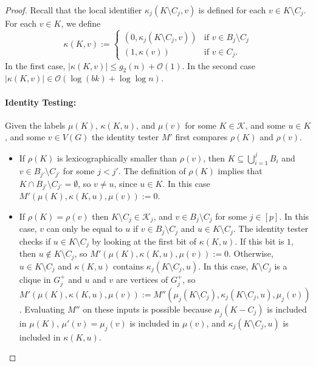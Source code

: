 \documentclass{patmorin}
\renewcommand{\le}{\leqslant}
\newcommand{\Oh}{\calO}
\newcommand{\calK}{\mathcal{K}}
\newcommand{\calO}{\mathcal{O}}
\begin{document}
\begin{proof}
    Recall that the local identifier $\kappa_j(K\setminus C_j,v)$ is defined for each $v\in K\setminus C_j$.
    For each $v\in K$, we define
    \[
         \kappa(K,v):=
         \begin{cases}
           (0,\kappa_j(K\setminus C_j,v)) & \text{if $v\in B_j\setminus C_j$} \\
           (1,\kappa(v)) & \text{if $v\in C_j$.}
         \end{cases}
     \]
     In the first case, $|\kappa(K,v)|\le g_2(n)+\Oh(1)$.
     In the second case $|\kappa(K,v)|\in \Oh(\log(bk)+\log\log n)$.


     \paragraph{Identity Testing:}
     Given the labels $\mu(K)$, $\kappa(K,u)$, and $\mu(v)$ for some $K\in\calK$, and some $u\in K$, and some $v\in V(G)$ the identity tester $M'$ first compares $\rho(K)$ and $\rho(v)$.
     \begin{itemize}
       \item If $\rho(K)$ is lexicographically smaller than $\rho(v)$, then $K\subseteq\bigcup_{i=1}^j B_i$ and $v\in B_{j'}\setminus C_{j'}$ for some $j < j'$.
       The definition of $\rho(K)$ implies that $K\cap B_{j'}\setminus C_{j'}=\emptyset$, so $v\neq u$, since $u\in K$. In this case $M'(\mu(K),\kappa(K,u),\mu(v)):=0$.
       
       \item If $\rho(K)=\rho(v)$ then $K\setminus C_j\in\calK_j$, and $v\in B_j\setminus C_j$ for some $j\in[p]$.
       In this case, $v$ can only be equal to $u$ if $v\in B_j\setminus C_j$ and $u\in K\setminus C_j$.
       The identity tester checks if $u\in K\setminus C_j$ by looking at the first bit of $\kappa(K,u)$.  If this bit is $1$, then $u\not\in K\setminus C_j$, so $M'(\mu(K),\kappa(K,u),\mu(v)):=0$.  Otherwise, $u\in K\setminus C_j$ and $\kappa(K,u)$ contains $\kappa_j(K\setminus C_j,u)$.  In this case, $K\setminus C_j$ is a clique in $G^+_j$ and $u$ and $v$ are vertices of $G^+_j$, so  $M'(\mu(K),\kappa(K,u),\mu(v)):=M''(\mu_j(K\setminus C_j),\kappa_j(K\setminus C_j,u),\mu_j(v))$.  Evaluating $M''$ on these inputs is possible because $\mu_j(K-C_j)$ is included in $\mu(K)$, $\mu'(v)=\mu_j(v)$ is included in $\mu(v)$, and $\kappa_j(K\setminus C_j,u)$ is included in $\kappa(K,u)$.
       

\end{itemize}
\end{proof}
\end{document}
